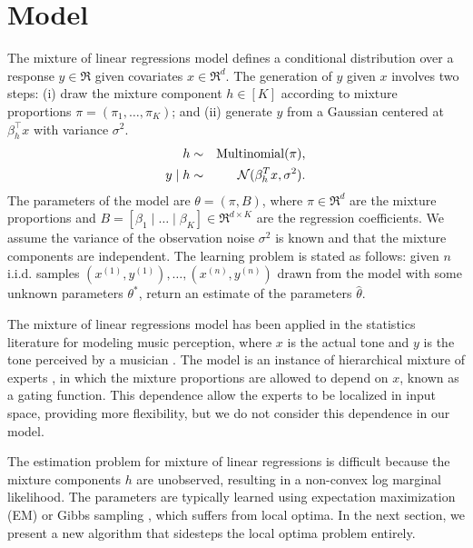 \section{Model}
\label{sec:model}

\newcommand{\xn}[1]{x^{(#1)}}
\newcommand{\xni}{\xn{i}}
\newcommand{\yn}[1]{y^{(#1)}}
\newcommand{\yni}{\yn{i}}

The mixture of linear regressions model \citep{VieleTong2002} defines
a conditional distribution over a response $y \in \Re$
given covariates $x \in \Re^d$.
The generation of $y$ given $x$ involves two steps:
(i) draw the mixture component $h \in [K]$ according to mixture proportions
$\pi = (\pi_1, \dots, \pi_K)$;
and (ii) generate $y$ from a Gaussian centered at $\beta_h^\top x$ with
variance $\sigma^2$.
\begin{eqnarray*}
  h &\sim& \operatorname{Multinomial}(\pi), \\
  y \mid h &\sim& \mathcal{N}( \beta_{h}^T x,  \sigma^2 ).
\end{eqnarray*}
The parameters of the model are $\theta = (\pi, B)$,
where $\pi \in \Re^d$ are the mixture proportions and
$B = [\beta_1 \mid \dots \mid \beta_K] \in \Re^{d \times K}$
are the regression coefficients.
We assume the variance of the observation noise $\sigma^2$ is known and that the mixture components are independent.
The learning problem is stated as follows:
given $n$ i.i.d. samples $(\xn{1}, \yn{1}), \dots, (\xn{n}, \yn{n})$
drawn from the model with some unknown parameters $\theta^*$,
return an estimate of the parameters $\hat\theta$.

The mixture of linear regressions model has been applied
in the statistics literature for modeling music perception, where $x$ is the
actual tone and $y$ is the tone perceived by a musician \cite{VieleTong2002}.
The model is an instance of hierarchical mixture of experts
\cite{jacobs91experts}, in which the mixture proportions are allowed to depend
on $x$, known as a gating function.
This dependence allow the experts to be localized in input space,
providing more flexibility, but we do not consider this dependence in our model.

The estimation problem for mixture of linear regressions is difficult because
the mixture components $h$ are unobserved,
resulting in a non-convex log marginal likelihood.
The parameters are typically learned using
expectation maximization (EM) or Gibbs sampling \cite{VieleTong2002},
which suffers from local optima.
In the next section, we present a new algorithm
that sidesteps the local optima problem entirely.
